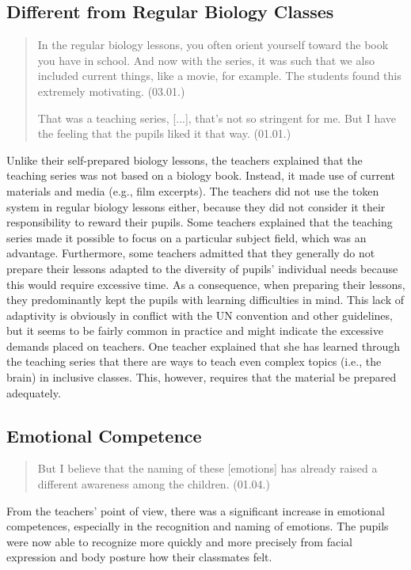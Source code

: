 \documentclass[11.5pt]{sig-alternate} %
\begin{document}
\begin{large}
\subsection*{Different from Regular Biology Classes}

\begin{quote}
    In the regular biology lessons, you often orient yourself toward the book you have in school. And now with the series, it was such that we also included current things, like a movie, for example. The students found this extremely motivating. (03.01.)
    
    That was a teaching series, [...], that’s not so stringent for me. But I have the feeling that the pupils liked it that way. (01.01.)
\end{quote}

Unlike their self-prepared biology lessons, the teachers explained that the teaching series was not based on a biology book. Instead, it made use of current materials and media (e.g., film excerpts). The teachers did not use the token system in regular biology lessons either, because they did not consider it their responsibility to reward their pupils. Some teachers explained that the teaching series made it possible to focus on a particular subject field, which was an advantage. Furthermore, some teachers admitted that they generally do not prepare their lessons adapted to the diversity of pupils’ individual needs because this would require excessive time. As a consequence, when preparing their lessons, they predominantly kept the pupils with learning difficulties in mind. This lack of adaptivity is obviously in conflict with the UN convention and other guidelines, but it seems to be fairly common in practice and might indicate the excessive demands placed on teachers. One teacher explained that she has learned through the teaching series that there are ways to teach even complex topics (i.e., the brain) in inclusive classes. This, however, requires that the material be prepared adequately.

\subsection*{Emotional Competence}

\begin{quote}
    But I believe that the naming of these [emotions] has already raised a different awareness among the children. (01.04.)
\end{quote}

From the teachers’ point of view, there was a significant increase in emotional competences, especially in the recognition and naming of emotions. The pupils were now able to recognize more quickly and more precisely from facial expression and body posture how their classmates felt.


\end{large}
\end{document}
